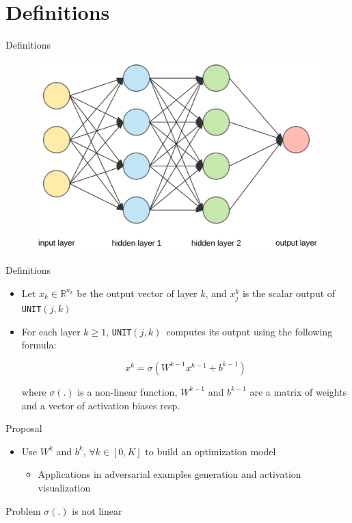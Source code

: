 \documentclass{beamer}
\newcommand{\UNIT}{\texttt{UNIT}$(j,k)$}
\begin{document}
\section{Definitions}
\begin{frame}{Definitions}
  \begin{figure}
      \centering
      \includegraphics[width=\columnwidth]{dnn.png}
  \end{figure}
\end{frame}

\begin{frame}{Definitions}
  \begin{itemize}
  \item Let $x_k \in \mathbb{R}^{n_k}$ be the output vector of layer $k$, and $x_j^k$ is the scalar output of \UNIT
  \item For each layer $k \geq 1$, \UNIT \  computes its output using the following formula:

  $$
  x^k = \sigma(W^{k-1} x^{k-1} + b^{k-1})
  $$

  where $\sigma(.)$ is a non-linear function, $W^{k-1}$ and $b^{k-1}$ are a matrix of weights and a vector of activation biases resp.
  \end{itemize}
\end{frame}

\begin{frame}{Proposal}
  \begin{itemize}
  \item Use $W^k$ and $b^k$, $\forall k \in [0, K]$ to build an optimization model
    \begin{itemize}
    \item Applications in adversarial examples generation and activation visualization
    \end{itemize}
  \end{itemize}
  \pause
  \begin{block}{Problem}
    \centering
    $\sigma(.)$ is not linear
  \end{block}
\end{frame}
\end{document}
